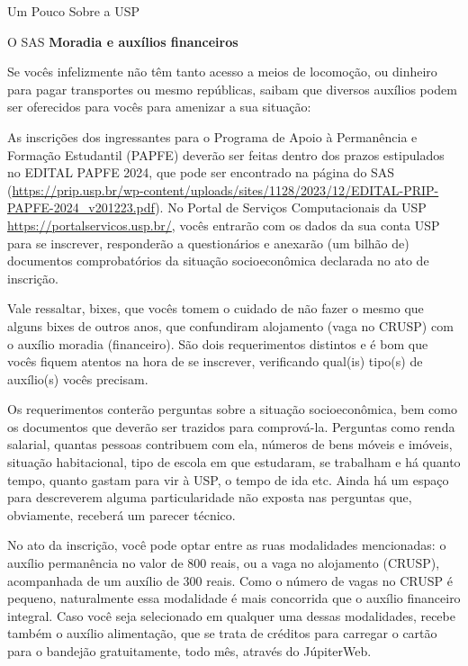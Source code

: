 \begin{secao}{Um Pouco Sobre a USP}
\begin{subsecao}{O SAS}
\textbf{Moradia e auxílios financeiros}

Se vocês infelizmente não têm tanto acesso a meios de locomoção, ou dinheiro para
pagar transportes ou mesmo repúblicas, saibam que diversos auxílios podem ser
oferecidos para vocês para amenizar a sua situação:



As inscrições dos ingressantes para o Programa de Apoio à Permanência e Formação Estudantil (PAPFE)
deverão ser feitas dentro dos prazos estipulados no EDITAL PAPFE 2024, que pode 
ser encontrado na página do SAS (\url{https://prip.usp.br/wp-content/uploads/sites/1128/2023/12/EDITAL-PRIP-PAPFE-2024_v201223.pdf}).
No Portal de Serviços Computacionais da USP \url{https://portalservicos.usp.br/}, vocês entrarão 
com os dados da sua conta USP para se inscrever, responderão a questionários e anexarão (um bilhão de) 
documentos comprobatórios da situação socioeconômica declarada no ato de inscrição.

Vale ressaltar, bixes, que vocês tomem o cuidado de não fazer o mesmo que alguns
bixes de outros anos, que confundiram alojamento (vaga no CRUSP) com o auxílio moradia (financeiro). São dois
requerimentos distintos e é bom que vocês fiquem atentos na hora de se inscrever, verificando
qual(is) tipo(s) de auxílio(s) vocês precisam.

Os requerimentos conterão perguntas sobre a situação socioeconômica, bem como os
documentos que deverão ser trazidos para comprová-la. Perguntas como renda
salarial, quantas pessoas contribuem com ela, números de bens móveis e imóveis,
situação habitacional, tipo de escola em que estudaram, se trabalham e há quanto
tempo, quanto gastam para vir à USP, o tempo de ida etc. Ainda há um espaço
para descreverem alguma particularidade não exposta nas perguntas que, obviamente,
receberá um parecer técnico.

No ato da inscrição, você pode optar entre as ruas modalidades mencionadas: o auxílio permanência
no valor de 800 reais, ou a vaga no alojamento (CRUSP), acompanhada de um auxílio de 300 reais. Como 
o número de vagas no CRUSP é pequeno, naturalmente essa modalidade é mais concorrida que o auxílio financeiro integral.
Caso você seja selecionado em qualquer uma dessas modalidades, recebe também o auxílio alimentação, que se trata de créditos
para carregar o cartão para o bandejão gratuitamente, todo mês, através do JúpiterWeb.


\end{subsecao}
\end{secao}
